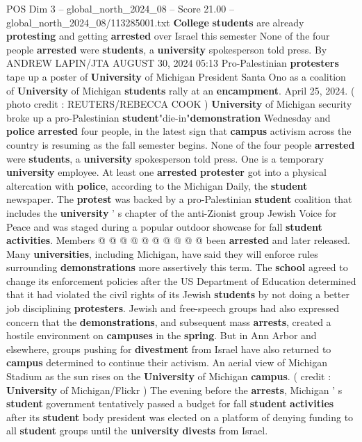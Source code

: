 \begin{textsample}{POS Dim 3 – global\_north\_2024\_08 – Score 21.00 – global\_north\_2024\_08/113285001.txt}  \label{ex:f3_pos_141}
\textbf{College} \textbf{students} are already \textbf{protesting} and getting \textbf{arrested} over Israel this semester None of the four people \textbf{arrested} were \textbf{students}, a \textbf{university} spokesperson told press.
By ANDREW LAPIN/JTA AUGUST 30, 2024 05:13 Pro-Palestinian \textbf{protesters} tape up a poster of \textbf{University} of Michigan President Santa Ono as a coalition of \textbf{University} of Michigan \textbf{students} rally at an \textbf{encampment}.
April 25, 2024. ( photo credit : REUTERS/REBECCA COOK ) \textbf{University} of Michigan security broke up a pro-Palestinian \textbf{student}"die-in"\textbf{demonstration} Wednesday and \textbf{police} \textbf{arrested} four people, in the latest sign that \textbf{campus} activism across the country is resuming as the fall semester begins.
None of the four people \textbf{arrested} were \textbf{students}, a \textbf{university} spokesperson told press.
One is a temporary \textbf{university} employee.
At least one \textbf{arrested} \textbf{protester} got into a physical altercation with \textbf{police}, according to the Michigan Daily, the \textbf{student} newspaper.
The \textbf{protest} was backed by a pro-Palestinian \textbf{student} coalition that includes the \textbf{university} ' s chapter of the anti-Zionist group Jewish Voice for Peace and was staged during a popular outdoor showcase for fall \textbf{student} \textbf{activities}.
Members @ @ @ @ @ @ @ @ @ @ been \textbf{arrested} and later released.
Many \textbf{universities}, including Michigan, have said they will enforce rules surrounding \textbf{demonstrations} more assertively this term.
The \textbf{school} agreed to change its enforcement policies after the US Department of Education determined that it had violated the civil rights of its Jewish \textbf{students} by not doing a better job disciplining \textbf{protesters}.
Jewish and free-speech groups had also expressed concern that the \textbf{demonstrations}, and subsequent mass \textbf{arrests}, created a hostile environment on \textbf{campuses} in the \textbf{spring}.
But in Ann Arbor and elsewhere, groups pushing for \textbf{divestment} from Israel have also returned to \textbf{campus} determined to continue their activism.
An aerial view of Michigan Stadium as the sun rises on the \textbf{University} of Michigan \textbf{campus}. ( credit : \textbf{University} of Michigan/Flickr ) The evening before the \textbf{arrests}, Michigan ' s \textbf{student} government tentatively passed a budget for fall \textbf{student} \textbf{activities} after its \textbf{student} body president was elected on a platform of denying funding to all \textbf{student} groups until the \textbf{university} \textbf{divests} from Israel.

\end{textsample}
